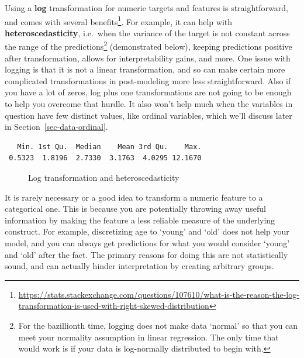 \documentclass[
  letterpaper,
]{krantz}
\DeclareRobustCommand{\href}[2]{#2\footnote{\url{#1}}}
\begin{document}
Using a \textbf{log} transformation for numeric targets and features is
straightforward, and
\href{https://stats.stackexchange.com/questions/107610/what-is-the-reason-the-log-transformation-is-used-with-right-skewed-distribution}{comes
with several benefits}. For example, it can help with
\textbf{heteroscedasticity}, i.e.~when the variance of the target is not
constant across the range of the predictions\footnote{For the
  bazillionth time, logging does not make data `normal' so that you can
  meet your normality assumption in linear regression. The only time
  that would work is if your data is log-normally distributed to begin
  with.} (demonstrated below), keeping predictions positive after
transformation, allows for interpretability gains, and more. One issue
with logging is that it is not a linear transformation, and so can make
certain more complicated transformations in post-modeling more less
straightforward. Also if you have a lot of zeros, log plus one
transformations are not going to be enough to help you overcome that
hurdle. It also won't help much when the variables in question have few
distinct values, like ordinal variables, which we'll discuss later in
Section~\ref{sec-data-ordinal}.

\begin{verbatim}
   Min. 1st Qu.  Median    Mean 3rd Qu.    Max. 
 0.5323  1.8196  2.7330  3.1763  4.0295 12.1670 
\end{verbatim}

\begin{figure}[H]


\caption{\label{fig-log-transformation-heteroscedasticity}Log
transformation and heteroscedasticity}

\end{figure}%

\begin{tcolorbox}[enhanced jigsaw, opacityback=0, leftrule=.75mm, bottomrule=.15mm, colframe=quarto-callout-tip-color-frame, rightrule=.15mm, breakable, left=2mm, colback=white, arc=.35mm, toprule=.15mm]

It is rarely necessary or a good idea to transform a numeric feature to
a categorical one. This is because you are potentially throwing away
useful information by making the feature a less reliable measure of the
underlying construct. For example, discretizing age to `young' and `old'
does not help your model, and you can always get predictions for what
you would consider `young' and `old' after the fact. The primary reasons
for doing this are not statistically sound, and can actually hinder
interpretation by creating arbitrary groups.

\end{tcolorbox}
\end{document}
